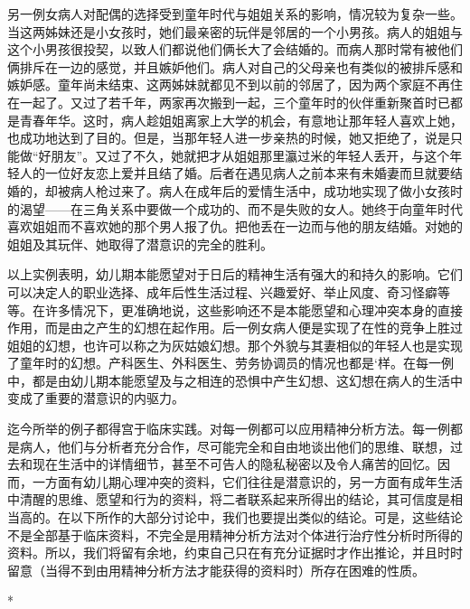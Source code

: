 \documentclass[UTF8,10pt,a4paper,openany]{book}
\begin{document}
另一例女病人对配偶的选择受到童年时代与姐姐关系的影响，情况较为复杂一些。当这两姊妹还是小女孩时，她们最亲密的玩伴是邻居的一个小男孩。病人的姐姐与这个小男孩很投契，以致人们都说他们俩长大了会结婚的。而病人那时常有被他们俩排斥在一边的感觉，并且嫉妒他们。病人对自己的父母亲也有类似的被排斥感和嫉妒感。童年尚未结束、这两姊妹就都见不到以前的邻居了，因为两个家庭不再住在一起了。又过了若千年，两家再次搬到一起，三个童年时的伙伴重新聚首时已都是青春年华。这时，病人趁姐姐离家上大学的机会，有意地让那年轻人喜欢上她，也成功地达到了目的。但是，当那年轻人进一步亲热的时候，她又拒绝了，说是只能做“好朋友”。又过了不久，她就把才从姐姐那里瀛过米的年轻人丢开，与这个年轻人的一位好友恋上爱并且结了婚。后者在遇见病人之前本来有未婚妻而旦就要结婚的，却被病人枪过来了。病人在成年后的爱情生活中，成功地实现了做小女孩时的渴望——在三角关系中要做一个成功的、而不是失败的女人。她终于向童年时代喜欢姐姐而不喜欢她的那个男人报了仇。把他丢在一边而与他的朋友结婚。对她的姐姐及其玩伴、她取得了潜意识的完全的胜利。

以上实例表明，幼儿期本能愿望对于日后的精神生活有强大的和持久的影响。它们可以决定人的职业选择、成年后性生活过程、兴趣爱好、举止风度、奇习怪癖等等。在许多情况下，更准确地说，这些影响还不是本能愿望和心理冲突本身的直接作用，而是由之产生的幻想在起作用。后一例女病人便是实现了在性的竞争上胜过姐姐的幻想，也许可以称之为灰姑娘幻想。那个外貌与其妻相似的年轻人也是实现了童年时的幻想。产科医生、外科医生、劳务协调员的情况也都是‘样。在每一例中，都是由幼儿期本能愿望及与之相连的恐惧中产生幻想、这幻想在病人的生活中变成了重要的潜意识的内驱力。

迄今所举的例子都得宫于临床实践。对每一例都可以应用精神分析方法。每一例都是病人，他们与分析者充分合作，尽可能完全和自由地谈出他们的思维、联想，过去和现在生活中的详情细节，甚至不可告人的隐私秘密以及令人痛苦的回忆。因而，一方面有幼儿期心理冲突的资料，它们往往是潜意识的，另一方面有成年生活中清醒的思维、愿望和行为的资料，将二者联系起来所得出的结论，其可信度是相当高的。在以下所作的大部分讨论中，我们也要提出类似的结论。可是，这些结论不是全部基于临床资料，不完全是用精神分析方法对个体进行治疗性分析时所得的资料。所以，我们将留有余地，约束自己只在有充分证据时才作出推论，并且时时留意（当得不到由用精神分析方法才能获得的资料时）所存在困难的性质。

*
\end{document}
